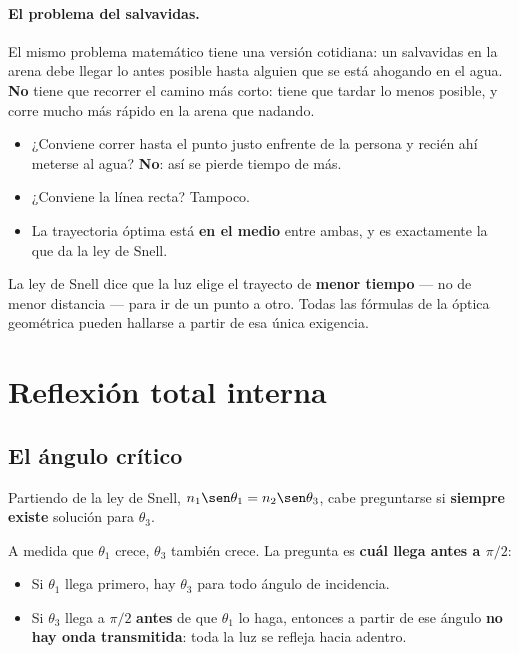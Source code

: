 \documentclass[12pt,a4paper]{article}
\begin{document}
\paragraph{El problema del salvavidas.}
El mismo problema matemático tiene una versión cotidiana: un salvavidas en la
arena debe llegar lo antes posible hasta alguien que se está ahogando en el agua.
\textbf{No} tiene que recorrer el camino más corto: tiene que tardar lo menos
posible, y corre mucho más rápido en la arena que nadando.

\begin{itemize}
  \item ¿Conviene correr hasta el punto justo enfrente de la persona y recién ahí
        meterse al agua? \textbf{No}: así se pierde tiempo de más.
  \item ¿Conviene la línea recta? Tampoco.
  \item La trayectoria óptima está \textbf{en el medio} entre ambas, y es
        exactamente la que da la ley de Snell.
\end{itemize}

\begin{keybox}
La ley de Snell dice que la luz elige el trayecto de \textbf{menor tiempo} --- no
de menor distancia --- para ir de un punto a otro. Todas las fórmulas de la óptica
geométrica pueden hallarse a partir de esa única exigencia.
\end{keybox}

\section{Reflexión total interna}

\subsection{El ángulo crítico}

Partiendo de la ley de Snell, $n_1\sen\theta_1 = n_2\sen\theta_3$, cabe
preguntarse si \textbf{siempre existe} solución para $\theta_3$.

A medida que $\theta_1$ crece, $\theta_3$ también crece. La pregunta es
\textbf{cuál llega antes a $\pi/2$}:

\begin{itemize}
  \item Si $\theta_1$ llega primero, hay $\theta_3$ para todo ángulo de
        incidencia.
  \item Si $\theta_3$ llega a $\pi/2$ \textbf{antes} de que $\theta_1$ lo haga,
        entonces a partir de ese ángulo \textbf{no hay onda transmitida}: toda la
        luz se refleja hacia adentro.
\end{itemize}
\end{document}
